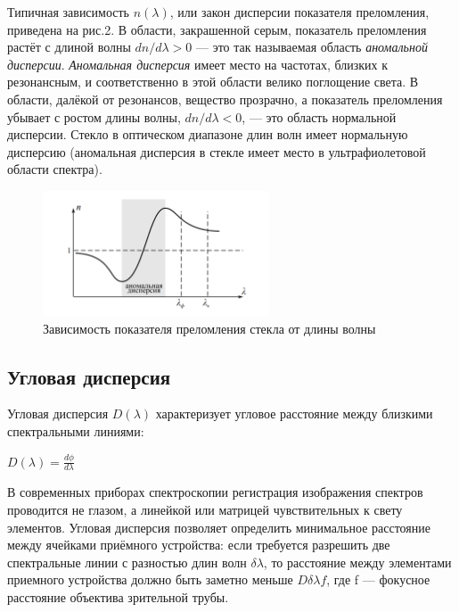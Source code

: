 Типичная зависимость $n(\lambda)$, или закон дисперсии показателя преломления, приведена на рис.2. В области, закрашенной серым, показатель преломления растёт с длиной волны $dn/d\lambda > 0$ — это так называемая область \textit{аномальной дисперсии}. \textit{Аномальная дисперсия} имеет место на частотах, близких к резонансным, и соответственно в этой области велико поглощение света. В области, далёкой от резонансов, вещество прозрачно, а показатель преломления убывает с ростом длины волны, $dn/d\lambda < 0$, — это область нормальной дисперсии. Стекло в оптическом диапазоне длин волн имеет нормальную дисперсию (аномальная дисперсия в стекле имеет место в ультрафиолетовой области спектра).

\begin{figure}[H]
	\centering
	\includegraphics[width=0.6\textwidth]{../Изображения/Зависимость показателя преломления стекла от длины волны.png}
	\caption{Зависимость показателя преломления стекла от длины волны}
\end{figure}

\subsection*{Угловая дисперсия}

Угловая дисперсия $D(\lambda)$ характеризует угловое расстояние между
близкими спектральными линиями:

\begin{center}
	{\Large $D(\lambda) = \frac{d\phi}{d\lambda}$}
\end{center}

В современных приборах спектроскопии регистрация изображения спектров проводится не глазом, а линейкой или матрицей чувствительных к свету элементов. Угловая дисперсия позволяет определить минимальное расстояние между ячейками приёмного устройства: если требуется разрешить две спектральные линии с разностью длин волн $\delta\lambda$, то расстояние между элементами приемного устройства должно быть заметно меньше $D\delta\lambda f$, где f — фокусное расстояние объектива зрительной трубы.

